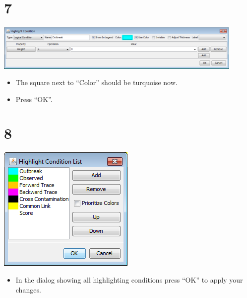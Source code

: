 \documentclass[10pt]{beamer}
\begin{document}
\section{7}
\begin{frame}
	\begin{center}
  		\includegraphics[width=0.9\textwidth]{7.png}
	\end{center}
	\begin{itemize}
		\item The square next to ``Color'' should be turquoise now.
		\item Press ``OK''.
	\end{itemize}
\end{frame}

\section{8}
\begin{frame}
	\begin{center}
  		\includegraphics[scale=0.5]{8.png}
	\end{center}
	\begin{itemize}
		\item In the dialog showing all highlighting conditions press ``OK'' to apply your changes.
	\end{itemize}
\end{frame}
\end{document}
